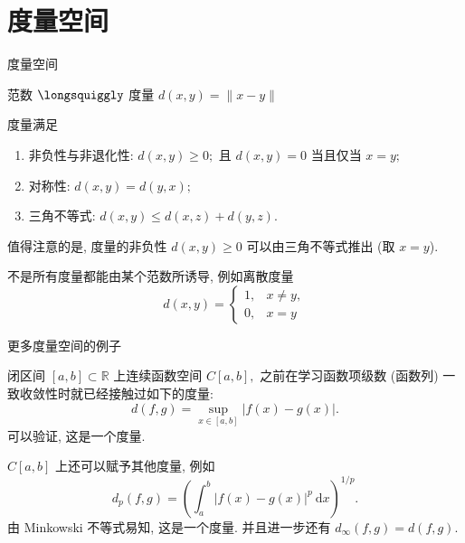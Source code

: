 
\section[度量空间]{度量空间}


\begin{frame}{度量空间}

范数 $\longsquiggly$ 度量 \quad $d(x, y) = \lVert x - y \rVert$

\pause
\vspace{1em}

度量满足
\begin{enumerate}
\item 非负性与非退化性: $d(x, y) \geqslant 0;$ 且 $d(x ,y) = 0$ 当且仅当 $x = y;$
\item 对称性: $d(x, y) = d(y, x);$
\item 三角不等式: $d(x, y) \leqslant d(x, z) + d(y, z).$
\end{enumerate}

\pause
\vspace{1em}

值得注意的是, 度量的非负性 $d(x, y) \geqslant 0$ 可以由三角不等式推出 (取 $x = y$).

\pause
\vspace{1em}

不是所有度量都能由某个范数所诱导, 例如离散度量
\[
d(x, y) = \begin{cases}
1, & x \neq y, \\ 0, & x = y
\end{cases}
\]

\end{frame}


\begin{frame}{更多度量空间的例子}

闭区间 $[a, b] \subset \mathbb{R}$ 上连续函数空间 $C[a, b],$ 之前在学习函数项级数 (函数列) 一致收敛性时就已经接触过如下的度量:
\[d(f, g) = \sup\limits_{x \in [a, b]} \lvert f(x) - g(x) \rvert.\]
可以验证, 这是一个度量.

\pause
\vspace{1em}

$C[a, b]$ 上还可以赋予其他度量, 例如
\[d_p(f, g) = \left( \int_a^b \lvert f(x) - g(x) \rvert^p ~ \mathrm{d}x \right)^{1/p}.\]
由 Minkowski 不等式易知, 这是一个度量.
\pause
并且进一步还有 $d_{\infty}(f,g) = d(f,g).$

\end{frame}

